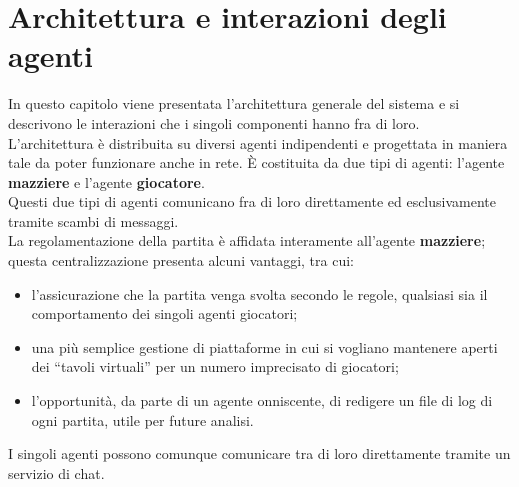 \chapter*{Architettura e interazioni degli agenti}
\graphicspath{{Chapter3/Chapter3Figs/PNG/}{Chapter3/Chapter3Figs/PDF/}{Chapter3/Chapter3Figs/}}

In questo capitolo viene presentata l'architettura generale del sistema e si descrivono le interazioni che i singoli componenti hanno fra di loro.\\
L'architettura è distribuita su diversi agenti indipendenti e progettata in maniera tale da poter funzionare anche in rete.
È costituita da due tipi di agenti: l'agente \textbf{mazziere} e l'agente \textbf{giocatore}.\\
Questi due tipi di agenti comunicano fra di loro direttamente ed esclusivamente tramite scambi di messaggi.\\
La regolamentazione della partita è affidata interamente all'agente \textbf{mazziere}; questa centralizzazione presenta alcuni vantaggi, tra cui:
\begin{itemize}
   \item l'assicurazione che la partita venga svolta secondo le regole, qualsiasi sia il comportamento dei singoli agenti giocatori;
   \item una più semplice gestione di piattaforme in cui si vogliano mantenere aperti dei ``tavoli virtuali'' per un numero imprecisato di giocatori;
   \item l'opportunità, da parte di un agente onniscente, di redigere un file di log di ogni partita, utile per future analisi.
\end{itemize}
\noindent
I singoli agenti possono comunque comunicare tra di loro direttamente tramite un servizio di chat.
